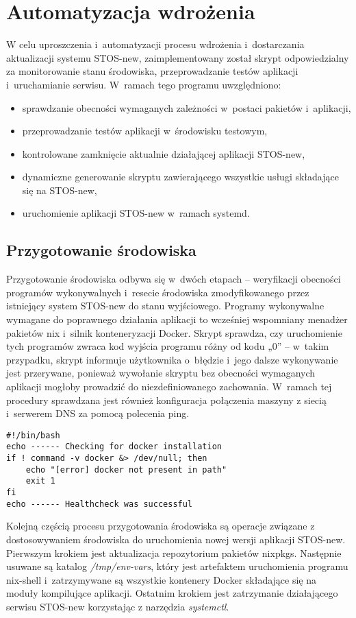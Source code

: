 
\section{Automatyzacja wdrożenia}
W celu uproszczenia i~automatyzacji procesu wdrożenia i~dostarczania aktualizacji systemu STOS-new, zaimplementowany został skrypt odpowiedzialny za monitorowanie stanu środowiska, przeprowadzanie testów aplikacji i~uruchamianie serwisu. W~ramach tego programu uwzględniono:
\begin{itemize}
	\item sprawdzanie obecności wymaganych zależności w~postaci pakietów i~aplikacji,
	\item przeprowadzanie testów aplikacji w~środowisku testowym,
	\item kontrolowane zamknięcie aktualnie działającej aplikacji STOS-new,
	\item dynamiczne generowanie skryptu zawierającego wszystkie usługi składające się na STOS-new,
	\item uruchomienie aplikacji STOS-new w~ramach systemd.
\end{itemize}
\subsection{Przygotowanie środowiska}
Przygotowanie środowiska odbywa się w~dwóch etapach -- weryfikacji obecności programów wykonywalnych i~resecie środowiska zmodyfikowanego przez istniejący system STOS-new do stanu wyjściowego. 
\newline \noindent Programy wykonywalne wymagane do poprawnego działania aplikacji to wcześniej wspomniany menadżer pakietów nix i~silnik konteneryzacji Docker. Skrypt sprawdza, czy uruchomienie tych programów zwraca kod wyjścia programu różny od kodu „0” -- w~takim przypadku, skrypt informuje użytkownika o~błędzie i~jego dalsze wykonywanie jest przerywane, ponieważ wywołanie skryptu bez obecności wymaganych aplikacji mogłoby prowadzić do niezdefiniowanego zachowania. W~ramach tej procedury sprawdzana jest również konfiguracja połączenia maszyny z siecią i~serwerem DNS za pomocą polecenia ping.
\lstset{style=shell}
\begin{lstlisting}[caption = {Przykład weryfikacji obecności instalacji programu „docker” w~systemie.}]
#!/bin/bash
echo ------ Checking for docker installation 
if ! command -v docker &> /dev/null; then
    echo "[error] docker not present in path"
    exit 1
fi
echo ------ Healthcheck was successful 
\end{lstlisting}
\noindent Kolejną częścią procesu przygotowania środowiska są operacje związane z dostosowywaniem środowiska do uruchomienia nowej wersji aplikacji STOS-new. Pierwszym krokiem jest aktualizacja repozytorium pakietów nixpkgs. Następnie usuwane są katalog \textit{/tmp/env-vars}, który jest artefaktem uruchomienia programu nix-shell i~zatrzymywane są wszystkie kontenery Docker składające się na moduły kompilujące aplikacji. Ostatnim krokiem jest zatrzymanie działającego serwisu STOS-new korzystając z narzędzia \textit{systemctl}.
